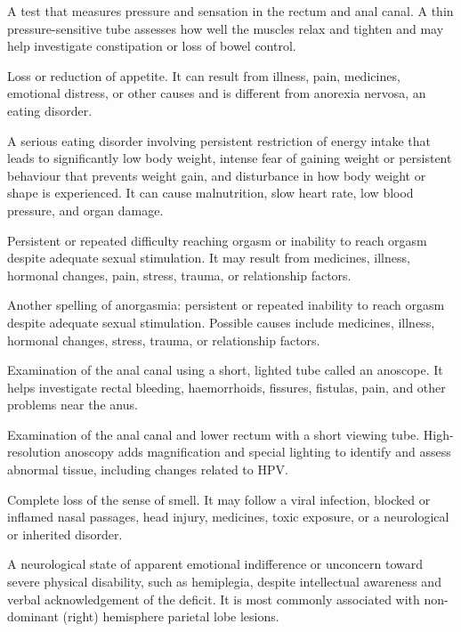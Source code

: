  A test that measures pressure and sensation in the rectum and anal canal. A thin pressure-sensitive tube assesses how well the muscles relax and tighten and may help investigate constipation or loss of bowel control.

 Loss or reduction of appetite. It can result from illness, pain, medicines, emotional distress, or other causes and is different from anorexia nervosa, an eating disorder.

 A serious eating disorder involving persistent restriction of energy intake that leads to significantly low body weight, intense fear of gaining weight or persistent behaviour that prevents weight gain, and disturbance in how body weight or shape is experienced. It can cause malnutrition, slow heart rate, low blood pressure, and organ damage.


 Persistent or repeated difficulty reaching orgasm or inability to reach orgasm despite adequate sexual stimulation. It may result from medicines, illness, hormonal changes, pain, stress, trauma, or relationship factors.

 Another spelling of anorgasmia: persistent or repeated inability to reach orgasm despite adequate sexual stimulation. Possible causes include medicines, illness, hormonal changes, stress, trauma, or relationship factors.

 Examination of the anal canal using a short, lighted tube called an anoscope. It helps investigate rectal bleeding, haemorrhoids, fissures, fistulas, pain, and other problems near the anus.

 Examination of the anal canal and lower rectum with a short viewing tube. High-resolution anoscopy adds magnification and special lighting to identify and assess abnormal tissue, including changes related to HPV.

 Complete loss of the sense of smell. It may follow a viral infection, blocked or inflamed nasal passages, head injury, medicines, toxic exposure, or a neurological or inherited disorder.

 A neurological state of apparent emotional indifference or unconcern toward severe physical disability, such as hemiplegia, despite intellectual awareness and verbal acknowledgement of the deficit. It is most commonly associated with non-dominant (right) hemisphere parietal lobe lesions.

